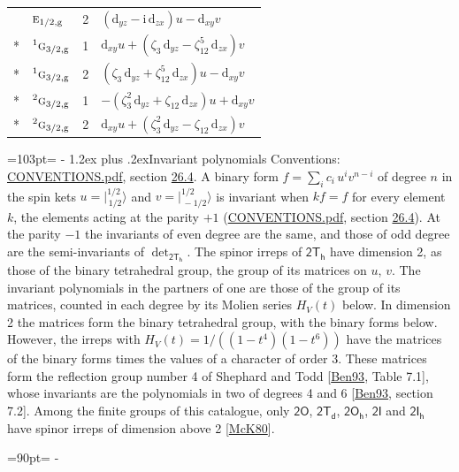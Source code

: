\documentclass[10pt,a4paper]{article}
\makeatletter
\renewcommand\section{\@startsection{section}{1}{\z@}{-3ex plus -1ex minus -.2ex}%
  {1.2ex plus .2ex}{\normalfont\large\sffamily\bfseries\color{parttitle}}}
\newcommand{\needspace}[1]{\par\penalty-100\begingroup\dimen0=#1\relax\dimen2=\pagegoal
  \advance\dimen2-\pagetotal\ifdim\dimen0>\dimen2\relax\ifdim\dimen2>0pt\vfil\break\fi\fi
  \endgroup}
\numberwithin{equation}{section}
\newcommand{\grp}[1]{\mathsf{#1}}
\newcommand{\irr}[1]{\text{\normalfont\scshape #1}}
\newcommand{\conjpair}[1]{{}^{#1}}
\newcommand{\ptag}[1]{\mathrm{#1}}
\newcommand{\orbital}[1]{\mathrm{#1}}
\newcommand{\iunit}{\mathrm{i}}
\newcommand{\rootunity}[1]{\zeta_{#1}}
\newcommand{\jm}[2]{\bigl\lvert{}^{#1}_{\,#2}\bigr\rangle}
\makeatother
\begin{document}
{\begin{longtable}{@{}llrl@{}}
 & $\irr{e}_{1/2,\ptag{g}}$ & 2 & $\left(\orbital{d}_{yz} - \iunit{}\,\orbital{d}_{zx}\right)u-\orbital{d}_{xy}v$\\*
 & $\conjpair{1}\irr{g}_{3/2,\ptag{g}}$ & 1 & $\orbital{d}_{xy}u+\left(\rootunity{3}\,\orbital{d}_{yz} - \rootunity{12}^{5}\,\orbital{d}_{zx}\right)v$\\*
 & $\conjpair{1}\irr{g}_{3/2,\ptag{g}}$ & 2 & $\left(\rootunity{3}\,\orbital{d}_{yz} + \rootunity{12}^{5}\,\orbital{d}_{zx}\right)u-\orbital{d}_{xy}v$\\*
 & $\conjpair{2}\irr{g}_{3/2,\ptag{g}}$ & 1 & $-\left(\rootunity{3}^{2}\,\orbital{d}_{yz} + \rootunity{12}\,\orbital{d}_{zx}\right)u+\orbital{d}_{xy}v$\\*
 & $\conjpair{2}\irr{g}_{3/2,\ptag{g}}$ & 2 & $\orbital{d}_{xy}u+\left(\rootunity{3}^{2}\,\orbital{d}_{yz} - \rootunity{12}\,\orbital{d}_{zx}\right)v$\\
\bottomrule\end{longtable}}
\needspace{103pt}
\section{Invariant polynomials}\label{s:invariants}
Conventions: \href{../../CONVENTIONS.pdf}{CONVENTIONS.pdf}, section \href{../../CONVENTIONS.pdf\#conv.26.4}{26.4}.
\leavevmode\label{n:local.binary.form}A binary form $f = \sum_i c_i\, u^i v^{n-i}$ of degree $n$ in the spin kets $u = \jm{1/2}{1/2}$ and $v = \jm{1/2}{-1/2}$ is invariant when $k f = f$ for every element $k$, the elements acting at the parity $+1$ (\href{../../CONVENTIONS.pdf}{CONVENTIONS.pdf}, section \href{../../CONVENTIONS.pdf\#conv.26.4}{26.4}). At the parity $-1$ the invariants of even degree are the same, and those of odd degree are the semi-invariants of $\det_{\grp{2T_{h}}}$.
The spinor irreps of $\grp{2T_{h}}$ have dimension 2, as those of the binary tetrahedral group, the group of its matrices on $u$, $v$. \label{n:function.hilbert}The invariant polynomials in the partners of one are those of the group of its matrices, counted in each degree by its Molien series $H_V(t)$ below. In dimension 2 the matrices form the binary tetrahedral group, with the binary forms below. However, the irreps with $H_V(t) = 1/((1 - t^{4})(1 - t^{6}))$ have the matrices of the binary forms times the values of a character of order 3. These matrices form the reflection group number 4 of Shephard and Todd [\href{../../../REFERENCES.pdf\#ref.Ben93}{Ben93}, Table 7.1], whose invariants are the polynomials in two of degrees 4 and 6 [\href{../../../REFERENCES.pdf\#ref.Ben93}{Ben93}, section 7.2]. Among the finite groups of this catalogue, only $\grp{2O}$, $\grp{2T_{d}}$, $\grp{2O_{h}}$, $\grp{2I}$ and $\grp{2I_{h}}$ have spinor irreps of dimension above 2 [\href{../../../REFERENCES.pdf\#ref.McK80}{McK80}].
\needspace{90pt}
\end{document}
